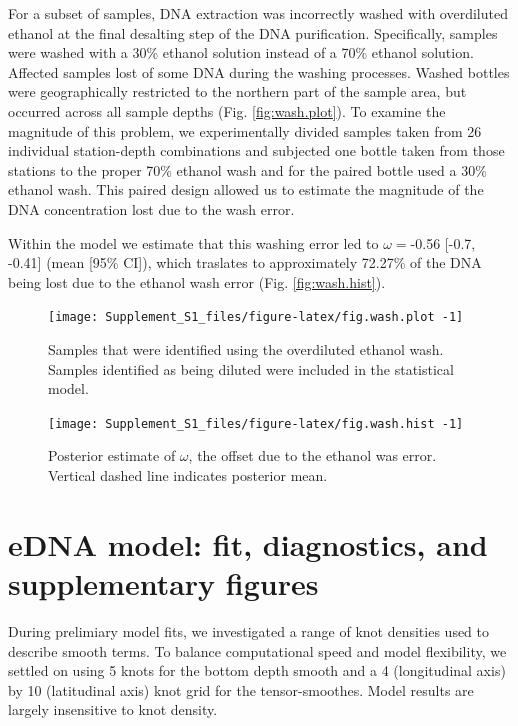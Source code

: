 \documentclass[
]{article}
\begin{document}
For a subset of samples, DNA extraction was incorrectly washed with
overdiluted ethanol at the final desalting step of the DNA purification.
Specifically, samples were washed with a 30\% ethanol solution instead
of a 70\% ethanol solution. Affected samples lost of some DNA during the
washing processes. Washed bottles were geographically restricted to the
northern part of the sample area, but occurred across all sample depths
(Fig. \ref{fig:wash.plot}). To examine the magnitude of this problem, we
experimentally divided samples taken from 26 individual station-depth
combinations and subjected one bottle taken from those stations to the
proper 70\% ethanol wash and for the paired bottle used a 30\% ethanol
wash. This paired design allowed us to estimate the magnitude of the DNA
concentration lost due to the wash error.

Within the model we estimate that this washing error led to
\(\omega =\)-0.56 {[}-0.7, -0.41{]} (mean {[}95\% CI{]}), which
traslates to approximately 72.27\% of the DNA being lost due to the
ethanol wash error (Fig. \ref{fig:wash.hist}).

\begin{figure}
\texttt{[image: Supplement\_S1\_files/figure-latex/fig.wash.plot -1]} \caption{\label{fig:wash.plot} Samples that were identified using the overdiluted ethanol wash. Samples identified as being diluted were included in the statistical model.}\label{fig:fig.wash.plot }
\end{figure}

\begin{figure}
\texttt{[image: Supplement\_S1\_files/figure-latex/fig.wash.hist -1]} \caption{\label{fig:wash.hist} Posterior estimate of \(\omega\), the offset due to the ethanol was error. Vertical dashed line indicates posterior mean. }\label{fig:fig.wash.hist }
\end{figure}

\newpage
\clearpage

\hypertarget{edna-model-fit-diagnostics-and-supplementary-figures}{%
\section{eDNA model: fit, diagnostics, and supplementary
figures}\label{edna-model-fit-diagnostics-and-supplementary-figures}}

During prelimiary model fits, we investigated a range of knot densities
used to describe smooth terms. To balance computational speed and model
flexibility, we settled on using 5 knots for the bottom depth smooth and
a 4 (longitudinal axis) by 10 (latitudinal axis) knot grid for the
tensor-smoothes. Model results are largely insensitive to knot density.
\end{document}
